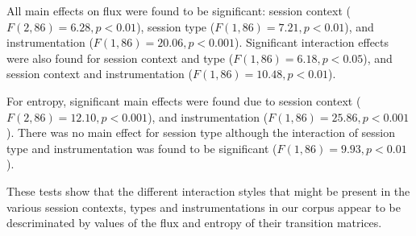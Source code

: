 \documentclass{sigchi}
\begin{document}
All main effects on flux were found to be significant: session
context ($F(2,86) = 6.28, p < 0.01$), session type
($F(1,86) = 7.21, p < 0.01$), and instrumentation
($F(1,86) = 20.06, p < 0.001$). Significant interaction effects were
also found for session context and type
($F(1,86) = 6.18, p < 0.05$), and session context and
instrumentation ($F(1,86) = 10.48, p < 0.01$).

For entropy, significant main effects were found due to session
context ($F(2,86) = 12.10, p < 0.001$), and instrumentation
($F(1,86) = 25.86, p < 0.001$).
There was no main effect for session type although
 the interaction of session type and
instrumentation was found to be significant
($F(1,86) = 9.93, p<0.01$).

These tests show that the different interaction styles that might be
present in the various session contexts, types and instrumentations in our corpus
appear to be descriminated  by values of the flux and entropy of their transition
matrices.
\end{document}
